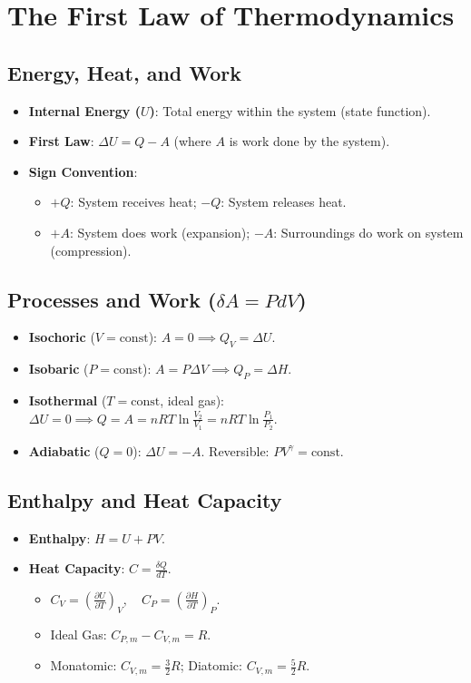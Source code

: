 \section{The First Law of Thermodynamics}

\subsection{Energy, Heat, and Work}
\begin{itemize}
    \item \textbf{Internal Energy ($U$)}: Total energy within the system (state function).
    \item \textbf{First Law}: $\Delta U = Q - A$ (where $A$ is work done by the system).
    \item \textbf{Sign Convention}:
    \begin{itemize}
        \item $+Q$: System receives heat; $-Q$: System releases heat.
        \item $+A$: System does work (expansion); $-A$: Surroundings do work on system (compression).
    \end{itemize}
\end{itemize}

\subsection{Processes and Work ($\delta A = P dV$)}
\begin{itemize}
    \item \textbf{Isochoric} ($V = \text{const}$): $A = 0 \implies Q_V = \Delta U$.
    \item \textbf{Isobaric} ($P = \text{const}$): $A = P \Delta V \implies Q_P = \Delta H$.
    \item \textbf{Isothermal} ($T = \text{const}$, ideal gas): $\Delta U = 0 \implies Q = A = nRT \ln \frac{V_2}{V_1} = nRT \ln \frac{P_1}{P_2}$.
    \item \textbf{Adiabatic} ($Q = 0$): $\Delta U = -A$. Reversible: $PV^\gamma = \text{const}$.
\end{itemize}

\subsection{Enthalpy and Heat Capacity}
\begin{itemize}
    \item \textbf{Enthalpy}: $H = U + PV$.
    \item \textbf{Heat Capacity}: $C = \frac{\delta Q}{dT}$.
    \begin{itemize}
        \item $C_V = \left( \frac{\partial U}{\partial T} \right)_V, \quad C_P = \left( \frac{\partial H}{\partial T} \right)_P$.
        \item Ideal Gas: $C_{P,m} - C_{V,m} = R$.
        \item Monatomic: $C_{V,m} = \frac{3}{2}R$; Diatomic: $C_{V,m} = \frac{5}{2}R$.
    \end{itemize}
\end{itemize}

